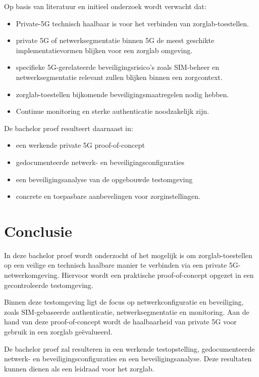 Op basis van literatuur en initieel onderzoek wordt verwacht dat:

\begin{itemize}
	\item Private-5G technisch haalbaar is voor het verbinden van zorglab-toestellen.
	\item private 5G of netwerksegmentatie binnen 5G de meest geschikte implementatievormen blijken voor een zorglab omgeving.
	\item specifieke 5G-gerelateerde beveiligingsrisico’s zoals SIM-beheer en netwerksegmentatie relevant zullen blijken binnen een zorgcontext.
	\item zorglab-toestellen bijkomende beveiligingsmaatregelen nodig hebben.
	\item Continue monitoring en sterke authenticatie noodzakelijk zijn.
\end{itemize}
De bachelor proef resulteert daarnaast in:
\begin{itemize}
	\item een werkende private 5G proof-of-concept
	\item gedocumenteerde netwerk- en beveiligingsconfiguraties
	\item een beveiligingsanalyse van de opgebouwde testomgeving
	\item concrete en toepasbare aanbevelingen voor zorginstellingen.
\end{itemize}

\section*{Conclusie}

In deze bachelor proef wordt onderzocht of het mogelijk is om 
zorglab-toestellen op een veilige en technisch haalbare manier te 
verbinden via een private 5G-netwerkomgeving. Hiervoor wordt een 
praktische proof-of-concept opgezet in een gecontroleerde testomgeving.


Binnen deze testomgeving ligt de focus op netwerkconfiguratie en 
beveiliging, zoals SIM-gebaseerde authenticatie, netwerksegmentatie en 
monitoring. Aan de hand van deze proof-of-concept wordt de haalbaarheid 
van private 5G voor gebruik in een zorglab geëvalueerd.


De bachelor proef zal resulteren in een werkende testopstelling, 
gedocumenteerde netwerk- en beveiligingsconfiguraties en een 
beveiligingsanalyse. Deze resultaten kunnen dienen als een leidraad voor het zorglab.
